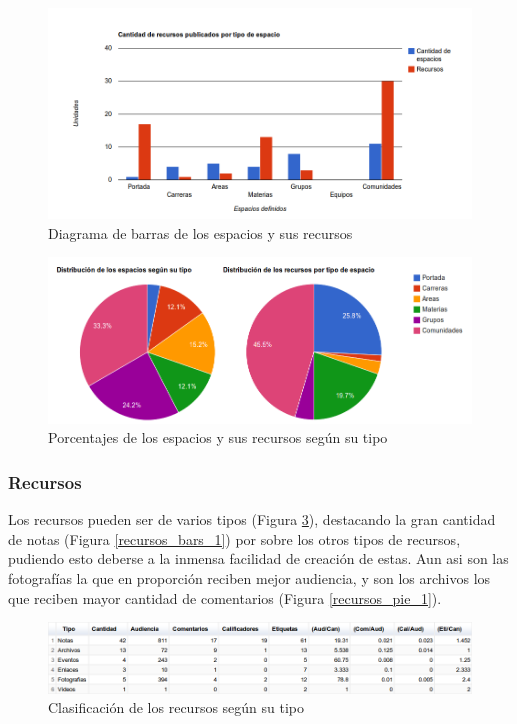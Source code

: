\begin{figure}[H]
\centering
    \includegraphics[scale=0.4]{graphics/espacios_bars_1.png}
    \caption {Diagrama de barras de los espacios y sus recursos}
    \label {espacios_bars_1}
\end{figure}

\begin{figure}[H]
\centering
    \includegraphics[scale=0.4]{graphics/espacios_pie_1.png}
    \caption {Porcentajes de los espacios y sus recursos seg\'un su tipo}
    \label {espacios_pie_1}
\end{figure}

\subsubsection{Recursos}

Los recursos pueden ser de varios tipos (Figura \ref{recursos_tabla_1}), destacando la gran cantidad de notas 
(Figura \ref{recursos_bars_1}) por sobre los otros tipos de recursos, pudiendo esto deberse a la inmensa facilidad de 
creaci\'on de estas. Aun asi son las fotograf\'ias la que en proporci\'on reciben mejor audiencia, y son los archivos los 
que reciben mayor cantidad de comentarios (Figura \ref{recursos_pie_1}).
\begin{figure}[H]
\centering
    \includegraphics[scale=0.4]{graphics/recursos_tabla_1.png}
    \caption {Clasificaci\'on de los recursos seg\'un su tipo}
    \label {recursos_tabla_1}
\end{figure}

